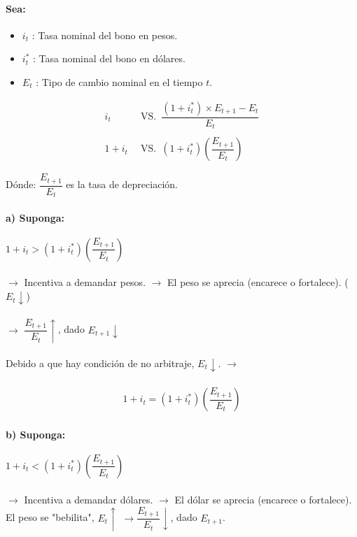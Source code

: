 \documentclass[8pt]{article}
\begin{document}
\paragraph*{Sea:}

\begin{itemize}
    \item $i_t$ : Tasa nominal del bono en pesos.
    \item $i_t^*$ : Tasa nominal del bono en dólares.
    \item $E_t$ : Tipo de cambio nominal en el tiempo $t$.
\end{itemize}

\begin{align*}
    i_t \,\,\, &\text{VS.} \,\,\, \dfrac{(1 + i_t^*) \times E_{t+1} - E_{t}}{E_{t}} \\\\
    1+i_t \,\,\, &\text{VS.} \,\,\, (1+i_t^*)\left(\dfrac{E_{t+1}}{E_{t}}\right)
\end{align*}

Dónde: $\dfrac{E_{t+1}}{E_{t}}$ es la tasa de depreciación.

\paragraph*{a) Suponga:}

$1+i_t > (1+i_t^*)\left(\dfrac{E_{t+1}}{E_{t}}\right)$ \\\\
$\rightarrow$ Incentiva a demandar pesos. $\rightarrow$ El peso se aprecia (encarece o fortalece). ($E_{t}\downarrow$) \\\\
$\rightarrow$ $\dfrac{E_{t+1}}{E_{t}} \uparrow$, dado $E_{t+1} \downarrow$ \\\\
    Debido a que hay condición de no arbitraje, $E_{t} \downarrow$. $\rightarrow$ \\\\
    \begin{align*}
        1+i_{t} = (1+i_{t}^*)\left(\dfrac{E_{t+1}}{E_{t}}\right)
    \end{align*}

\paragraph*{b) Suponga:}

$1+i_t < (1+i_t^*)\left(\dfrac{E_{t+1}}{E_{t}}\right)$ \\\\
$\rightarrow$ Incentiva a demandar dólares. $\rightarrow$ El dólar se aprecia (encarece o fortalece). El peso se "bebilita", $E_{t}\uparrow \,\, \rightarrow \dfrac{E_{t+1}}{E_{t}} \downarrow$, dado $E_{t+1}$.
\end{document}
